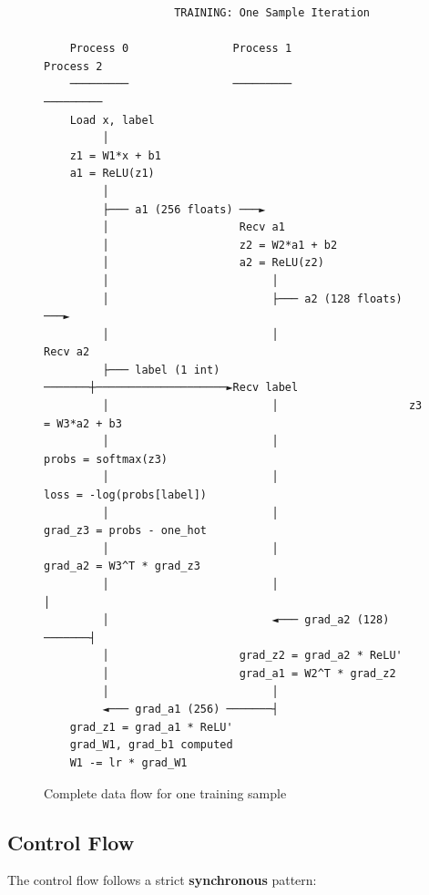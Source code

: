 \documentclass[11pt,a4paper]{article}
\begin{document}
\begin{figure}[h]
\centering
\begin{tcolorbox}[colback=white,colframe=black,width=\textwidth]
\begin{verbatim}
                    TRAINING: One Sample Iteration
    
    Process 0                Process 1                Process 2
    ─────────                ─────────                ─────────
    Load x, label
         │
    z1 = W1*x + b1
    a1 = ReLU(z1)
         │
         ├─── a1 (256 floats) ───►
         │                    Recv a1
         │                    z2 = W2*a1 + b2
         │                    a2 = ReLU(z2)
         │                         │
         │                         ├─── a2 (128 floats) ───►
         │                         │                    Recv a2
         ├─── label (1 int) ───────┼────────────────────►Recv label
         │                         │                    z3 = W3*a2 + b3
         │                         │                    probs = softmax(z3)
         │                         │                    loss = -log(probs[label])
         │                         │                    grad_z3 = probs - one_hot
         │                         │                    grad_a2 = W3^T * grad_z3
         │                         │                         │
         │                         ◄─── grad_a2 (128) ───────┤
         │                    grad_z2 = grad_a2 * ReLU'
         │                    grad_a1 = W2^T * grad_z2
         │                         │
         ◄─── grad_a1 (256) ───────┤
    grad_z1 = grad_a1 * ReLU'
    grad_W1, grad_b1 computed
    W1 -= lr * grad_W1
\end{verbatim}
\end{tcolorbox}
\caption{Complete data flow for one training sample}
\end{figure}

\subsection{Control Flow}

The control flow follows a strict \textbf{synchronous} pattern:
\end{document}
